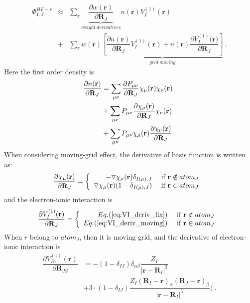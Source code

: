\documentclass[journal=jpca,manuscript=article]{achemso}
\renewcommand{\vec}[1]{{\bf #1}}
\begin{document}
\begin{eqnarray}
\Phi_{I,J}^{HF-r} & \approx &  \sum_{\mathbf{r}} \underbrace{   \dfrac{\partial{ w(\mathbf{r} )} } { \partial{\mathbf{R}_{J}} } }_{weight \ derivatives}
n(\mathbf{r}) V_{I}^{(1)}{(\mathbf{r})}  \nonumber  \\ & + &  \sum_{\mathbf{r}}  w(\mathbf{r} )  \underbrace{   \left[ \dfrac{\partial{n(\mathbf{r})} }  
{ \partial{\mathbf{R}_{J}} }V_{I}^{(1)}{(\mathbf{r})} +
  n(\mathbf{r}) \dfrac{\partial{V_{I}^{(1)}
{(\mathbf{r}} )  }}{ \partial{\mathbf{R}_{J}} }     \right] }_{grid\ moving} \;. 
\label{eq:Hessian_HF_r_moving}
\end{eqnarray}
Here the first order density is
\begin{eqnarray}
\dfrac{\partial n(\mathbf{r})}{\partial \mathbf{R}_J}& = \sum_{\mu \nu} \dfrac{\partial  P_{\mu \nu}}{\partial \vec{R}_{J}} \chi_{\mu}(\vec{r})\chi_{\nu}(\vec{r}) \nonumber \\
   &+ \sum_{\mu \nu} P_{\mu \nu} \dfrac{\partial \chi_{\mu}(\vec{r})}{\partial \vec{R}_{J}} \chi_{\nu}(\vec{r}) \nonumber \\
    &+ \sum_{\mu \nu} P_{\mu \nu} \chi_{\mu}(\vec{r}) \dfrac{\partial \chi_{\nu}(\vec{r})}{\partial \vec{R}_{J}}  \;. 
\end{eqnarray}
When considering moving-grid effect, the derivative of basis function is written as:
\begin{equation}
\frac{\partial \chi_{\mu}(\vec{r})}{\partial \vec{R}_{J}} = \left\{ \begin{array}{rl}
 -\triangledown \chi_{\mu}(\vec{r})\delta_{I(\mu),J} &\mbox{ if $\mathbf{r} \notin atom_{J}$ } \\
  \triangledown \chi_{\mu}(\vec{r})(1-\delta_{I(\mu),J}) &\mbox{ if $\mathbf{r} \in atom_{J}$}
       \end{array} \right.
\end{equation}
and the electron-ionic interaction is 
\begin{equation}
\frac{\partial V_{I}^{(1)}(\mathbf{r})  }{\partial \vec{R}_{J}} = \left\{ \begin{array}{rl}
  Eq.(\ref{eq:VI_deriv_fix}) &\mbox{ if $\mathbf{r} \notin atom_{J}$ } \\
  Eq.(\ref{eq:VI_deriv_moving})  &\mbox{ if $\mathbf{r} \in atom_{J}$}
      \end{array} \right.
\end{equation}
When $r$ belong to $atom_{J}$, then it is moving grid, and the derivative of electron-ionic interaction is 
\begin{eqnarray}
 \dfrac{\partial{ V_{I\alpha}^{(1)}(\mathbf{r})   } }  
{ \partial{\mathbf{R}_{J\beta}} } & = -(1-\delta_{IJ})\delta_{\alpha \beta}  \dfrac{Z_I }{|\mathbf{r}-\mathbf{R}_{I}|^3 }  \nonumber   \\
   & +3\cdot (1-\delta_{IJ})  \dfrac{Z_I(\mathbf{R}_{I}-\mathbf{r})_{\alpha}(\mathbf{R}_{J}-\mathbf{r})_{\beta} }{|\mathbf{r}-\mathbf{R}_{I}|^5 }  ) \;.   
 \label{eq:VI_deriv_moving}
\end{eqnarray}
\end{document}
